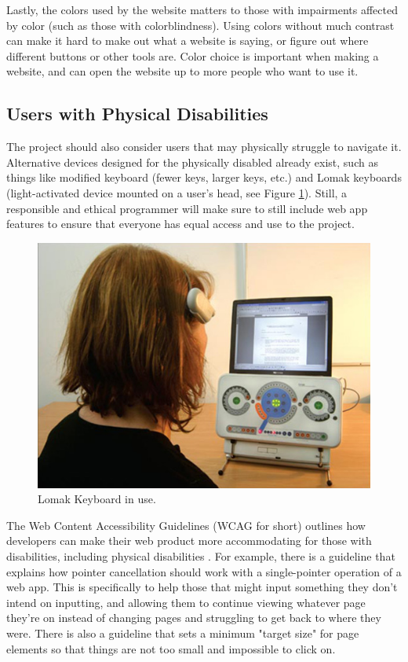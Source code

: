 \documentclass[10pt,twocolumn]{article}
\begin{document}
Lastly, the colors used by the website matters to those with impairments affected by color (such as those with colorblindness).
Using colors without much contrast can make it hard to make out what a website is saying, or figure out where different buttons or other tools are.
Color choice is important when making a website, and can open the website up to more people who want to use it.

\subsection{Users with Physical Disabilities}

The project should also consider users that may physically struggle to navigate it.
Alternative devices designed for the physically disabled already exist, such as things like modified keyboard (fewer keys, larger keys, etc.) and Lomak keyboards (light-activated device mounted on a user's head, see Figure \ref{fig:LomakKeyboard}).
Still, a responsible and ethical programmer will make sure to still include web app features to ensure that everyone has equal access and use to the project.

\begin{figure}[ht!]
    \centering
    \includegraphics[width=.95\linewidth]{LomakKeyboard.jpg}
    \caption{
        Lomak Keyboard in use.
    }
    \label{fig:LomakKeyboard}
\end{figure}

The Web Content Accessibility Guidelines (WCAG for short) outlines how developers can make their web product more accommodating for those with disabilities, including physical disabilities \cite{WCAG2point1}.
For example, there is a guideline that explains how pointer cancellation should work with a single-pointer operation of a web app. %
This is specifically to help those that might input something they don't intend on inputting, and allowing them to continue viewing whatever page they're on instead of changing pages and struggling to get back to where they were.
There is also a guideline that sets a minimum "target size" for page elements so that things are not too small and impossible to click on. %
\end{document}
